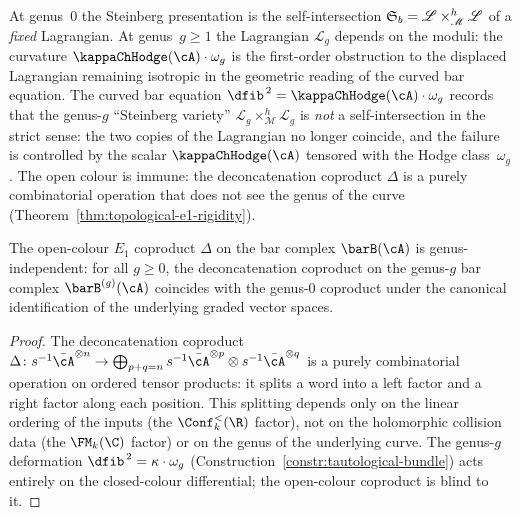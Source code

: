 \begin{remark}
\label{rem:steinberg-genus-deformation}
At genus~$0$ the Steinberg presentation is the self-intersection
$\mathfrak{S}_b = \mathscr{L} \times_{\mathscr{M}}^h \mathscr{L}$ of a
\emph{fixed} Lagrangian. At genus~$g \ge 1$ the Lagrangian
$\mathscr{L}_g$ depends on the moduli: the curvature
$\kappaChHodge(\cA) \cdot \omega_g$ is the first-order obstruction to the
displaced Lagrangian remaining isotropic in the geometric reading of
the curved bar equation.
The curved bar equation $\dfib^{\,2} = \kappaChHodge(\cA) \cdot \omega_g$
records that the genus-$g$ ``Steinberg variety''
$\mathscr{L}_g \times_{\mathscr{M}}^h \mathscr{L}_g$
is \emph{not} a self-intersection in the strict sense: the two
copies of the Lagrangian no longer coincide, and the failure
is controlled by the scalar $\kappaChHodge(\cA)$ tensored with the Hodge
class~$\omega_g$. The open colour is immune: the deconcatenation
coproduct $\Delta$ is a purely combinatorial operation that does
not see the genus of the curve
(Theorem~\ref{thm:topological-e1-rigidity}).
\end{remark}

\begin{theorem}
\label{thm:topological-e1-rigidity}
The open-colour $E_1$ coproduct\/ $\Delta$ on the bar complex\/
$\barB(\cA)$ is genus-independent: for all $g \ge 0$,
the deconcatenation coproduct on the genus-$g$ bar complex\/
$\barB^{(g)}(\cA)$ coincides with the genus-$0$ coproduct under
the canonical identification of the underlying graded vector spaces.
\end{theorem}

\begin{proof}
The deconcatenation coproduct
$\Delta\colon s^{-1}\bar\cA^{\otimes n} \to
\bigoplus_{p+q=n} s^{-1}\bar\cA^{\otimes p}
\otimes s^{-1}\bar\cA^{\otimes q}$
is a purely combinatorial operation on ordered tensor products:
it splits a word into a left factor and a right factor along each
position. This splitting depends only on the linear ordering of
the inputs (the $\Conf_k^{<}(\R)$ factor), not on the holomorphic
collision data (the $\FM_k(\C)$ factor) or on the genus of the
underlying curve. The genus-$g$ deformation
$\dfib^{\,2} = \kappa \cdot \omega_g$
(Construction~\ref{constr:tautological-bundle}) acts entirely on the
closed-colour differential; the open-colour coproduct is blind to it.
\end{proof}

